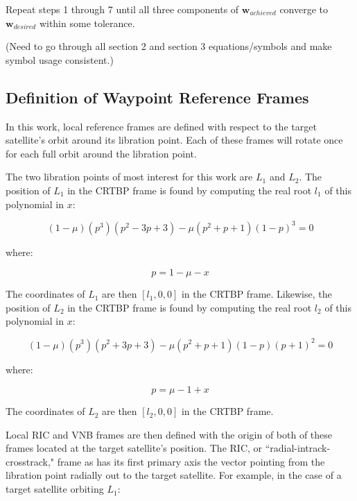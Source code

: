 \documentclass[]{article}
\begin{document}
Repeat steps 1 through 7 until all three components of \(\mathbf{w}_{achieved}\) converge to \(\mathbf{w}_{desired}\) within some tolerance.

(Need to go through all section 2 and section 3 equations/symbols and make symbol usage consistent.)

\subsection{Definition of Waypoint Reference Frames}

In this work, local reference frames are defined with respect to the target satellite's orbit around its libration point.  Each of these frames will rotate once for each full orbit around the libration point.

The two libration points of most interest for this work are \(L_1\) and \(L_2\).  The position of \(L_1\) in the CRTBP frame is found by computing the real root \(l_1\) of this polynomial in \(x\):

\begin{equation}
(1 - \mu)(p^3)(p^2 - 3p + 3) - \mu(p^2 + p + 1)(1 - p)^3 = 0
\end{equation}

where:

\begin{equation*}
p = 1 - \mu - x
\end{equation*}

The coordinates of \(L_1\) are then \([l_1, 0, 0]\) in the CRTBP frame.  Likewise, the position of \(L_2\) in the CRTBP frame is found by computing the real root \(l_2\) of this polynomial in \(x\):

\begin{equation}
(1 - \mu)(p^3)(p^2 + 3p + 3) - \mu(p^2 + p + 1)(1 - p)(p + 1)^2 = 0
\end{equation}

where:

\begin{equation*}
p = \mu - 1 + x
\end{equation*}

The coordinates of \(L_2\) are then \([l_2, 0, 0]\) in the CRTBP frame.

Local RIC and VNB frames are then defined with the origin of both of these frames located at the target satellite's position.  The RIC, or ``radial-intrack-crosstrack," frame as has its first primary axis the vector pointing from the libration point radially out to the target satellite.  For example, in the case of a target satellite orbiting \(L_1\):
\end{document}
